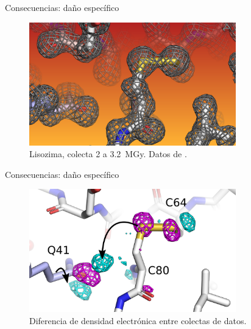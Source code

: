 \documentclass{beamer}
\begin{document}
\begin{frame}{Consecuencias: daño específico}
 \begin{figure}[h]
  \centering
  \includegraphics[width=0.8\textwidth]{after.png}
  \caption{Lisozima, colecta 2 a \SI{3.2}{\mega\gray}. Datos de \cite{Nanao2005}.}
 \end{figure}
\end{frame}
\begin{frame}{Consecuencias: daño específico}
 \begin{figure}[h]
  \centering
  \includegraphics[width=0.8\textwidth]{diff2.png}
  \caption{Diferencia de densidad electrónica entre colectas de datos. }
  \label{fig:nanao2005}
 \end{figure}
\end{frame}
\end{document}
